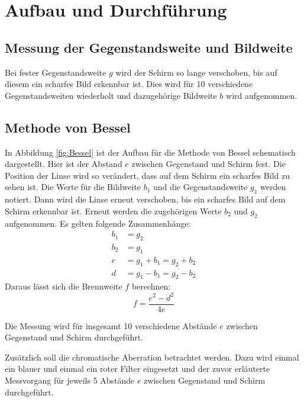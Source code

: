 \section {Aufbau und Durchführung}
\label{sec:durchführung}
\subsection{Messung der Gegenstandsweite und Bildweite}
Bei fester Gegenstandsweite $g$ wird der Schirm so lange verschoben, bis auf diesem ein scharfes Bild erkennbar ist. Dies wird für 10 verschiedene Gegenstandsweiten wiederholt und dazugehörige Bildweite $b$ wird aufgenommen.

\subsection{Methode von Bessel}
\label{sec:bessel}
In Abbildung \ref{fig:Bessel} ist der Aufbau für die Methode von Bessel schematisch dargestellt. Hier ist der Abstand $e$ zwischen Gegenstand und Schirm fest. Die Position der Linse wird so verändert, dass auf dem Schirm ein scharfes Bild zu sehen ist. Die Werte für die Bildweite $b_1$ und die Gegenstandsweite $g_1$ werden notiert. Dann wird die Linse erneut verschoben, bis ein scharfes Bild auf dem Schirm erkennbar ist. Erneut werden die zugehörigen Werte $b_2$ und $g_2$ aufgenommen.
Es gelten folgende Zusammenhänge:
\begin{align}
  b_1 &= g_2 \\
  b_2 &= g_1 \\
  e &= g_1+b_1 =g_2+b_2 \\
  d &= g_1 - b_1 = g_2 -b_2
\end{align}
Daraus lässt sich die Brennweite $f$ berechnen:
\begin{equation}
  f = \frac{e^2 - d^2}{4e}
\end{equation}

Die Messung wird für insgesamt 10 verschiedene Abstände $e$ zwischen Gegenstand und Schirm durchgeführt.

Zusätzlich soll die chromatische Aberration betrachtet werden. Dazu wird einmal ein blauer und einmal ein roter Filter eingesetzt und der zuvor erläuterte Messvorgang für jeweils 5 Abstände $e$ zwischen Gegenstand und Schirm durchgeführt.

